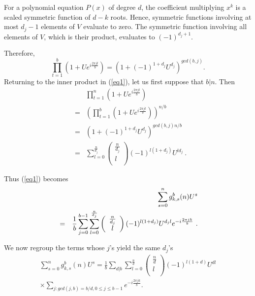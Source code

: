 For a polynomial equation $P(x)$ of degree $d$, the coefficient
multiplying $x^k$ is a scaled symmetric function of $d-k$ roots.
Hence, symmetric functions involving at most $d_j-1$ elements of
$V$ evaluate to zero. The symmetric function involving all
elements of $V$, which is their product, evaluates to
$(-1)^{d_j+1}$.

Therefore,
\begin{equation}
\prod_{t=1}^b (1+Ue^{i\frac{2\pi
jt}{b}})=\left(1+(-1)^{1+d_j}U^{d_j} \right)^{gcd(b,j)}.
\end{equation}
 Returning to the inner product in (\ref{eq1}), let us first
suppose that $b|n$. Then
\begin{equation}
\begin{array}{lll}
{}&{}&\prod_{t=1}^n \left(1+Ue^{i\frac{2\pi jt}{b}}\right)\\
{}&=&\left(\prod_{t=1}^b \left(1+Ue^{i\frac{2\pi
jt}{b}}\right)\right)^{n/b}\\
{}&=&\left(1+(-1)^{1+d_j}U^{d_j}
\right)^{gcd(b,j)n/b}\\
{}&=&\sum_{l=0}^{\frac{n}{d_j}} \left( \begin{array}{c}
                             \frac{n}{d_j} \\
                             l \\
                           \end{array}
                           \right)
(-1)^{l(1+d_j)}U^{ld_j}~.
\end{array}
\end{equation}

Thus (\ref{eq1}) becomes
\begin{eqnarray*}
{}&{}&\sum_{s=0}^n g^b_{k,s}(n)U^s\\&=&\frac{1}{b}\sum_{j=0}^{b-1}
\sum_{l=0}^{\frac{n}{d_j}} \left(
\begin{array}{c}
                             \frac{n}{d_j} \\
                             l \\
                           \end{array}
                           \right)(-1)^{l(1+d_j)}U^{d_jl}e^{-i\frac{2\pi
                           j k}{b}}~.\hspace{0.0in}
                           \end{eqnarray*}

We now regroup the terms whose $j$'s yield the same $d_j$'s
\begin{eqnarray*}
\sum_{s=0}^n g^b_{k,s}(n)U^s=\frac{1}{b}\sum_{d|b}
\sum_{l=0}^{\frac{n}{d}} \left(
\begin{array}{c}
                             \frac{n}{d} \\
                             l \\
                           \end{array}
                           \right)(-1)^{l(1+d)}U^{d l}\\ \times
\sum_{j: gcd(j,b)=b/d, 0 \leq j\leq b-1}e^{-i\frac{2\pi
                           j k}{b}}.
\end{eqnarray*}

